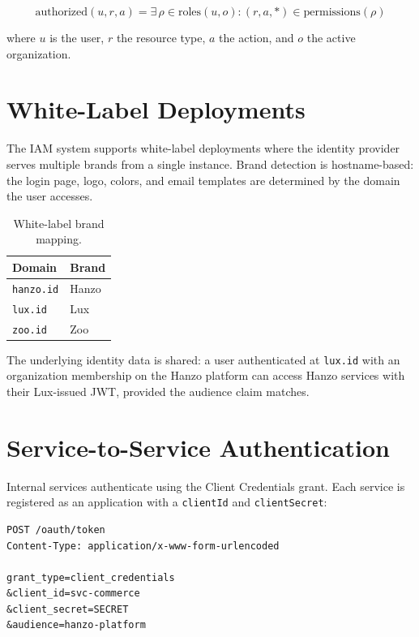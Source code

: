 \documentclass[11pt,a4paper]{article}
\begin{document}
\begin{equation}
    \text{authorized}(u, r, a) = \exists\, \rho \in \text{roles}(u, o) : (r, a, *) \in \text{permissions}(\rho)
\end{equation}

where $u$ is the user, $r$ the resource type, $a$ the action, and $o$ the active organization.

\section{White-Label Deployments}

The IAM system supports white-label deployments where the identity provider serves multiple brands from a single instance. Brand detection is hostname-based: the login page, logo, colors, and email templates are determined by the domain the user accesses.

\begin{table}[h]
\centering
\caption{White-label brand mapping.}
\begin{tabular}{ll}
\toprule
\textbf{Domain} & \textbf{Brand} \\
\midrule
\texttt{hanzo.id}   & Hanzo \\
\texttt{lux.id}     & Lux \\
\texttt{zoo.id}     & Zoo \\
\bottomrule
\end{tabular}
\end{table}

The underlying identity data is shared: a user authenticated at \texttt{lux.id} with an organization membership on the Hanzo platform can access Hanzo services with their Lux-issued JWT, provided the audience claim matches.

\section{Service-to-Service Authentication}

Internal services authenticate using the Client Credentials grant. Each service is registered as an application with a \texttt{clientId} and \texttt{clientSecret}:

\begin{lstlisting}[caption=Service authentication.]
POST /oauth/token
Content-Type: application/x-www-form-urlencoded

grant_type=client_credentials
&client_id=svc-commerce
&client_secret=SECRET
&audience=hanzo-platform
\end{lstlisting}
\end{document}
